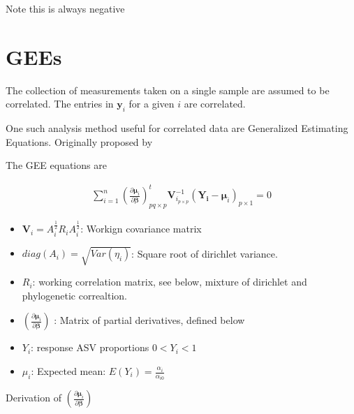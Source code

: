 \documentclass[10pt]{article}
\theoremstyle{definition}
\begin{document}
Note this is always negative

\section{GEEs }

The collection of measurements taken on a single sample are assumed to be correlated. The entries in $\mathbf{y}_{i}$ for a given $i$ are correlated.

One such analysis method useful for correlated data are Generalized Estimating Equations. Originally proposed by


The GEE equations are

\begin{align*}
  \sum_{i = 1}^n  \left(\frac{\partial  \boldsymbol\mu_i }{\partial \boldsymbol\beta }\right)_{pq \times p}^t\mathbf{V}_{i_{p \times p}}^{-1}(\mathbf{Y_i} - \boldsymbol\mu_i)_{p \times 1} = 0
\end{align*}


\begin{itemize}
  \item $\boldsymbol V_i = A_i^{\tfrac{1}{2}}R_iA_i^{\tfrac{1}{2}}$: Workign covariance matrix
  \item $diag(A_i) = \sqrt{Var(\eta_{i})}$: Square root of dirichlet variance.
  \item $R_i$: working correlation matrix, see below, mixture of dirichlet and phylogenetic correaltion.
  \item $\left(\frac{\partial  \boldsymbol\mu_i }{\partial \boldsymbol\beta }\right)$ : Matrix of partial derivatives, defined below
  \item $Y_i$: response ASV proportions $0 < Y_i < 1$
  \item $\mu_i$: Expected mean: $E(Y_i) = \frac{\alpha_i}{\alpha_{i0}}$
\end{itemize}




 Derivation of $\left(\frac{\partial  \boldsymbol\mu_i }{\partial \boldsymbol\beta }\right)$
\end{document}
